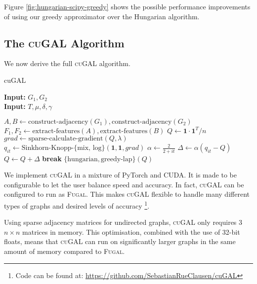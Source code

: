 Figure \ref{fig:hungarian-scipy-greedy} shows the possible performance improvements of using our greedy approximator over the Hungarian algorithm.

\subsection{The \textsc{cuGAL} Algorithm}
We now derive the full \textsc{cuGAL} algorithm.

\begin{algorithm}[H]
\caption{cuGAL}\label{alg:cugal-vertex-features}
\textbf{Input:} $G_1, G_2$ \\
\textbf{Input:} $T, \mu, \delta, \gamma$
\begin{algorithmic}[1]
    \State $A, B \gets \text{construct-adjacency}(G_1), \text{construct-adjacency}(G_2)$
    \State $F_1, F_2 \gets \text{extract-features}(A), \text{extract-features}(B)$
    \State $Q \gets \boldsymbol{1} \cdot \boldsymbol{1}^T / n$
         
            \State $grad \gets \text{sparse-calculate-gradient}(Q, \lambda)$
            \State $q_{it} \gets \text{Sinkhorn-Knopp-\{mix, log\}}(\boldsymbol{1}, \boldsymbol{1}, grad)$
            \State $\alpha \gets \frac{2}{2 + it}$
            \State $\Delta \gets \alpha(q_{it} - Q)$
            \State $Q \gets Q + \Delta$
                \State \textbf{break}
            \EndIf
        \EndFor
    \EndFor
\State \Return $\{\text{hungarian}, \text{greedy-lap}\}(Q)$
\end{algorithmic}
\end{algorithm}

We implement \textsc{cuGAL} in a mixture of PyTorch and CUDA. It is made to be configurable to let the user balance speed and accuracy. In fact, \textsc{cuGAL} can be configured to run as \textsc{Fugal}. This makes \textsc{cuGAL} flexible to handle many different types of graphs and desired levels of accuracy \footnote{Code can be found at: \url{https://github.com/SebastianRueClausen/cuGAL}}. 

Using sparse adjacency matrices for undirected graphs, \textsc{cuGAL} only requires 3 $n \times n$ matrices in memory. This optimisation, combined with the use of 32-bit floats, means that \textsc{cuGAL} can run on significantly larger graphs in the same amount of memory compared to \textsc{Fugal}.

